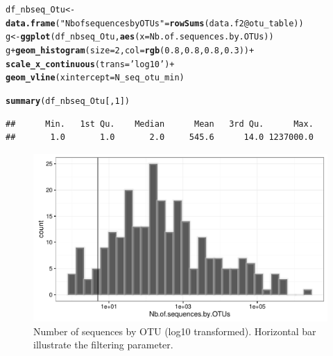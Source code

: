 \documentclass[12pt]{article}\usepackage[]{graphicx}\usepackage[]{color}
\makeatletter
\def\maxwidth{ %
  \ifdim\Gin@nat@width>\linewidth
    \linewidth
  \else
    \Gin@nat@width
  \fi
}
\newcommand{\hlnum}[1]{\textcolor[rgb]{0.686,0.059,0.569}{#1}}%
\newcommand{\hlstr}[1]{\textcolor[rgb]{0.192,0.494,0.8}{#1}}%
\newcommand{\hlopt}[1]{\textcolor[rgb]{0,0,0}{#1}}%
\newcommand{\hlstd}[1]{\textcolor[rgb]{0.345,0.345,0.345}{#1}}%
\newcommand{\hlkwb}[1]{\textcolor[rgb]{0.69,0.353,0.396}{#1}}%
\newcommand{\hlkwc}[1]{\textcolor[rgb]{0.333,0.667,0.333}{#1}}%
\newcommand{\hlkwd}[1]{\textcolor[rgb]{0.737,0.353,0.396}{\textbf{#1}}}%
\newenvironment{kframe}{%
 \def\at@end@of@kframe{}%
 \ifinner\ifhmode%
  \def\at@end@of@kframe{\end{minipage}}%
  \begin{minipage}{\columnwidth}%
 \fi\fi%
 \def\FrameCommand##1{\hskip\@totalleftmargin \hskip-\fboxsep
 \colorbox{shadecolor}{##1}\hskip-\fboxsep
     \hskip-\linewidth \hskip-\@totalleftmargin \hskip\columnwidth}%
 \MakeFramed {\advance\hsize-\width
   \@totalleftmargin\z@ \linewidth\hsize
   \@setminipage}}%
 {\par\unskip\endMakeFramed%
 \at@end@of@kframe}
\newenvironment{knitrout}{}{} %
\numberwithin{figure}{section}
\makeatother
\begin{document}
\begin{knitrout}\small
{}\color{fgcolor}\begin{kframe}
\begin{alltt}
\hlstd{df_nbseq_Otu} \hlkwb{<-} \hlkwd{data.frame}\hlstd{(}\hlstr{"Nb of sequences by OTUs"} \hlstd{=} \hlkwd{rowSums}\hlstd{(data.f2}\hlopt{@}\hlkwc{otu_table}\hlstd{))}
\hlstd{g} \hlkwb{<-} \hlkwd{ggplot}\hlstd{(df_nbseq_Otu,} \hlkwd{aes}\hlstd{(}\hlkwc{x} \hlstd{= Nb.of.sequences.by.OTUs))}
\hlstd{g} \hlopt{+} \hlkwd{geom_histogram}\hlstd{(}\hlkwc{size} \hlstd{=} \hlnum{2}\hlstd{,} \hlkwc{col} \hlstd{=} \hlkwd{rgb}\hlstd{(}\hlnum{0.8}\hlstd{,} \hlnum{0.8}\hlstd{,} \hlnum{0.8}\hlstd{,} \hlnum{0.3}\hlstd{))} \hlopt{+}
  \hlkwd{scale_x_continuous}\hlstd{(}\hlkwc{trans} \hlstd{=} \hlstr{'log10'}\hlstd{)} \hlopt{+}
  \hlkwd{geom_vline}\hlstd{(}\hlkwc{xintercept}\hlstd{= N_seq_otu_min)}
\end{alltt}


{\ttfamily\noindent\itshape\color{messagecolor}{\#\# `stat\_bin()` using `bins = 30`. Pick better value with `binwidth`.}}\begin{alltt}
\hlkwd{summary}\hlstd{(df_nbseq_Otu[,} \hlnum{1}\hlstd{])}
\end{alltt}
\begin{verbatim}
##      Min.   1st Qu.    Median      Mean   3rd Qu.      Max. 
##       1.0       1.0       2.0     545.6      14.0 1237000.0
\end{verbatim}
\end{kframe}\begin{figure}

{\centering \includegraphics[width=\maxwidth]{figure/nbseq_Otu-1} 

}

\caption[Number of sequences by OTU (log10 transformed)]{Number of sequences by OTU (log10 transformed). Horizontal bar illustrate the filtering parameter.}\label{fig:nbseq_Otu}
\end{figure}


\end{knitrout}
\end{document}
